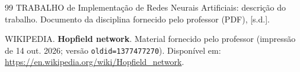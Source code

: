 \begin{thebibliography}{99}
 TRABALHO de Implementação de Redes Neurais Artificiais: descrição do trabalho. Documento
da disciplina fornecido pelo professor (PDF), [s.d.].

 WIKIPEDIA. \textbf{Hopfield network}. Material fornecido pelo professor (impressão de
14 out. 2026; versão \texttt{oldid=1377477270}). Disponível em:
\url{https://en.wikipedia.org/wiki/Hopfield_network}.

\end{thebibliography}
